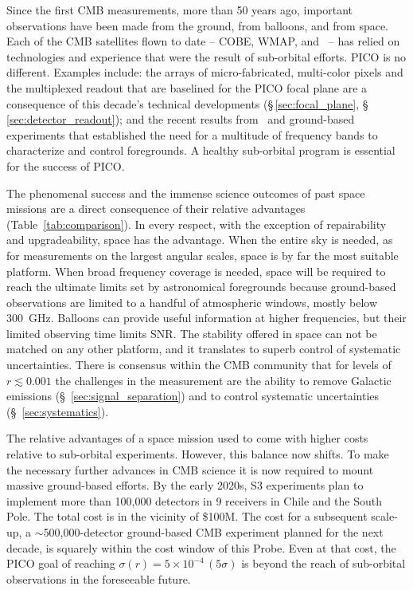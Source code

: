 \documentclass[PICOReport.tex]{subfiles}
\begin{document}
Since the first \ac{CMB} measurements, more than 50 years ago, important observations have been made from the ground, from balloons, and from space. Each of the CMB satellites flown to date -- COBE, WMAP, and \planck\ -- has relied on technologies and experience that were the result of sub-orbital efforts. PICO is no different. Examples include: the arrays of micro-fabricated, multi-color pixels and the multiplexed readout that are baselined for the PICO focal plane are a consequence of this decade's technical developments (\S\,\ref{sec:focal_plane}, \S\,\ref{sec:detector_readout}); and the recent results from \planck \ and ground-based experiments that established the need for a multitude of frequency bands to characterize and control foregrounds.  A healthy sub-orbital program is essential for the success of PICO. 


The phenomenal success and the immense science outcomes of past space missions are a direct consequence of their relative advantages (Table~\ref{tab:comparison}). In every respect, with the exception of repairability and upgradeability, space has the advantage. When the entire sky is needed, as for measurements on the largest angular scales, space is by far the most suitable platform.  When broad frequency coverage is needed, space will be required to reach the ultimate limits set by astronomical foregrounds because ground-based observations are limited to a handful of atmospheric windows, mostly below 300~GHz. Balloons can provide useful information at higher frequencies, but their limited observing time limits \ac{SNR}. The stability offered in space can not be matched on any other platform, and it translates to superb control of systematic uncertainties. There is consensus within the CMB community that for levels of $r \lesssim 0.001$ the challenges in the measurement are the ability to remove Galactic emissions (\S~\ref{sec:signal_separation}) and to control systematic uncertainties (\S~\ref{sec:systematics}). 

The relative advantages of a space mission used to come with higher costs relative to sub-orbital experiments. However, this balance now shifts. To make the necessary further advances in CMB science it is now required to mount massive ground-based efforts.  By the early 2020s, S3 experiments plan to implement more than 100,000 detectors in 9 receivers in Chile and the South Pole. The total cost is in the vicinity of \$100M. The cost for a subsequent scale-up, a $\sim$500,000-detector ground-based CMB experiment planned for the next decade, is squarely within the cost window of this Probe. Even at that cost, the PICO goal of reaching $\sigma(r) = 5 \times 10^{-4}\,(5 \sigma) $ is beyond the reach of sub-orbital observations in the foreseeable future.  
\end{document}
